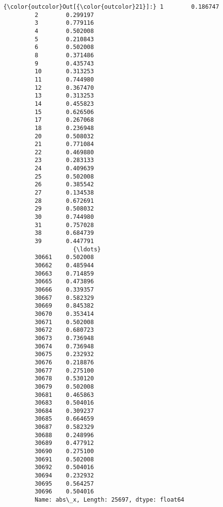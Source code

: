 \documentclass[11pt]{article}
\begin{document}
\begin{Verbatim}[commandchars=\\\{\}]
{\color{outcolor}Out[{\color{outcolor}21}]:} 1        0.186747
         2        0.299197
         3        0.779116
         4        0.502008
         5        0.210843
         6        0.502008
         8        0.371486
         9        0.435743
         10       0.313253
         11       0.744980
         12       0.367470
         13       0.313253
         14       0.455823
         15       0.626506
         17       0.267068
         18       0.236948
         20       0.508032
         21       0.771084
         22       0.469880
         23       0.283133
         24       0.409639
         25       0.502008
         26       0.385542
         27       0.134538
         28       0.672691
         29       0.508032
         30       0.744980
         31       0.757028
         38       0.684739
         39       0.447791
                    {\ldots}   
         30661    0.502008
         30662    0.485944
         30663    0.714859
         30665    0.473896
         30666    0.339357
         30667    0.582329
         30669    0.845382
         30670    0.353414
         30671    0.502008
         30672    0.680723
         30673    0.736948
         30674    0.736948
         30675    0.232932
         30676    0.218876
         30677    0.275100
         30678    0.530120
         30679    0.502008
         30681    0.465863
         30683    0.504016
         30684    0.309237
         30685    0.664659
         30687    0.582329
         30688    0.248996
         30689    0.477912
         30690    0.275100
         30691    0.502008
         30692    0.504016
         30694    0.232932
         30695    0.564257
         30696    0.504016
         Name: abs\_x, Length: 25697, dtype: float64
\end{Verbatim}
            
\end{document}
